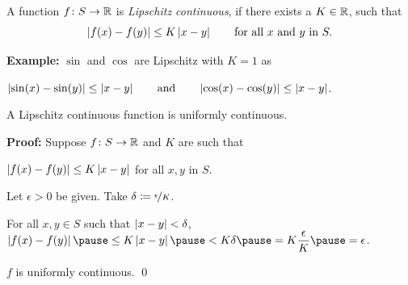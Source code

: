 \documentclass[10pt,aspectratio=169]{beamer}
\begin{document}
\begin{frame}

\begin{definition}
A function $f \colon S \to {\mathbb{R}}$
is \emph{Lipschitz continuous}, if there exists a $K \in {\mathbb{R}}$, such that
\begin{equation*}
\left\lvert {f(x)-f(y)} \right\rvert \leq K \left\lvert {x-y} \right\rvert 
\qquad \text{for all } x \text{ and } y \text{ in } S.
\end{equation*}
\end{definition}

\pause
\textbf{Example:} $\sin$ and $\cos$ are Lipschitz with $K=1$ as

$\left\lvert {\sin(x)-\sin(y)} \right\rvert \leq \left\lvert {x-y} \right\rvert \qquad \text{and} \qquad
\left\lvert {\cos(x)-\cos(y)} \right\rvert \leq \left\lvert {x-y} \right\rvert$.


\pause
\begin{proposition}
A Lipschitz continuous function is uniformly continuous.
\end{proposition}

\pause
\textbf{Proof:}
Suppose $f \colon S \to {\mathbb{R}}$ and $K$ are such that

$\left\lvert {f(x)-f(y)} \right\rvert \leq K \left\lvert {x-y} \right\rvert$ for all $x, y$ in $S$.

\pause
\medskip

Let $\epsilon > 0$ be given.
\pause
\quad
Take $\delta \coloneqq \nicefrac{\epsilon}{K}$.

\pause
\medskip

For all $x,y \in S$ such that
$\left\lvert {x-y} \right\rvert < \delta$,
\pause
\quad
$\abs{f(x)-f(y)}
\pause
\leq K \abs{x-y}
\pause
< K \delta
\pause
= K \dfrac{\epsilon}{K}
\pause
=
\epsilon$.

\pause
\medskip

\thus \quad $f$ is uniformly continuous.
\qed

\end{frame}
\end{document}
